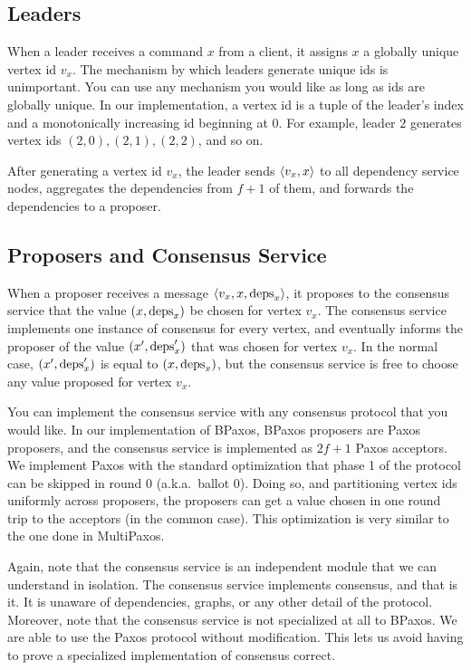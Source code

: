 \subsection{Leaders}
When a leader receives a command $x$ from a client, it assigns $x$ a globally
unique vertex id $v_x$. The mechanism by which leaders generate unique ids is
unimportant. You can use any mechanism you would like as long as ids are globally
unique. In our implementation, a vertex id is a tuple of the leader's index and
a monotonically increasing id beginning at $0$. For example, leader $2$
generates vertex ids $(2, 0), (2, 1), (2, 2)$, and so on.

After generating a vertex id $v_x$, the leader sends $\langle v_x, x \rangle$ to all
dependency service nodes, aggregates the dependencies from $f+1$ of them, and
forwards the dependencies to a proposer.

\subsection{Proposers and Consensus Service}
When a proposer receives a message $\langle v_x, x, \text{deps}_x \rangle$, it proposes to
the consensus service that the value $(x, \text{deps}_x)$ be chosen for vertex
$v_x$. The consensus service implements one instance of consensus for every
vertex, and eventually informs the proposer of the value $(x', \text{deps}_x')$
that was chosen for vertex $v_x$. In the normal case, $(x', \text{deps}_x')$ is
equal to $(x, \text{deps}_x)$, but the consensus service is free to choose any
value proposed for vertex $v_x$.

You can implement the consensus service with any consensus protocol that you would
like. In our implementation of BPaxos, BPaxos proposers are Paxos proposers,
and the consensus service is implemented as $2f+1$ Paxos acceptors. We
implement Paxos with the standard optimization that phase 1 of the protocol can
be skipped in round $0$ (a.k.a.\ ballot $0$). Doing so, and partitioning vertex
ids uniformly across proposers, the proposers can get a value chosen in one
round trip to the acceptors (in the common case). This optimization is very
similar to the one done in MultiPaxos.

Again, note that the consensus service is an independent module that we can
understand in isolation. The consensus service implements consensus, and that
is it. It is unaware of dependencies, graphs, or any other detail of the
protocol. Moreover, note that the consensus service is not specialized at all
to BPaxos. We are able to use the Paxos protocol without modification. This
lets us avoid having to prove a specialized implementation of consensus
correct.

